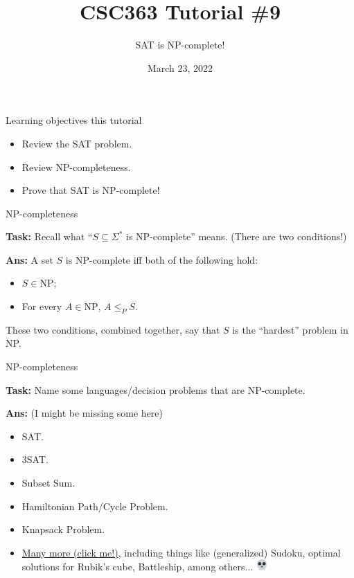 \documentclass{beamer}
\title{CSC363 Tutorial \#9}
\subtitle{SAT is NP-complete!}
\date{March 23, 2022}
\institute{}
\newcommand{\emojiskull}{\includegraphics[width=12pt]{img/skull.png}}
\begin{document}
\maketitle

\begin{frame}{Learning objectives this tutorial}
\begin{itemize}
\item Review the SAT problem.
\item Review NP-completeness.
\item Prove that SAT is NP-complete!
\end{itemize}
\end{frame}

\begin{frame}{NP-completeness}

\textbf{Task:} Recall what ``$S \subseteq \Sigma^*$ is NP-complete'' means. (There are two conditions!) 

\pause

\textbf{Ans:} A set $S$ is NP-complete iff both of the following hold:
\begin{itemize}
    \item $S \in \mathrm{NP}$;
    \item For every $A \in \mathrm{NP}$, $A \leq_P S$.
\end{itemize}
These two conditions, combined together, say that $S$ is the ``hardest'' problem in NP.
    
\end{frame}

\begin{frame}{NP-completeness}

\textbf{Task:} Name some languages/decision problems that are NP-complete.

\pause

\textbf{Ans:} (I might be missing some here)

\begin{itemize}
    \item SAT. \pause
    \item 3SAT. \pause
    \item Subset Sum. \pause
    \item Hamiltonian Path/Cycle Problem. \pause
    \item Knapsack Problem. \pause
    \item {\color{blue}\href{https://en.wikipedia.org/wiki/List_of_NP-complete_problems}{Many more (click me!)}}, including things like (generalized) Sudoku, optimal solutions for Rubik's cube, Battleship, among others... \emojiskull
\end{itemize}

\end{frame}
\end{document}
